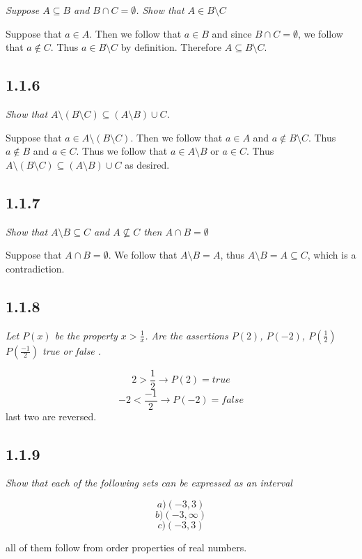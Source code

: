 \documentclass[11pt,oneside,titlepage]{book}
\begin{document}
\textit{Suppose $A \subseteq B$ and $B \cap C = \emptyset$. Show that $A \in B \setminus C$}

Suppose that $a \in A$. Then we follow that $a \in B$ and since $B \cap C = \emptyset$, we
follow that $a \notin C$. Thus $a \in B \setminus C$ by definition. Therefore
$A \subseteq B \setminus C$.

\subsection*{1.1.6}

\textit{Show that $A \setminus (B \setminus C) \subseteq (A \setminus B) \cup C$.}

Suppose that $a \in A \setminus (B \setminus C)$. Then we follow that
$a \in A$ and $a \notin B \setminus C$. Thus $a \notin B$ and $a \in C$. Thus we
follow that $a \in A \setminus B$ or $a \in C$. Thus
$A \setminus (B \setminus C) \subseteq (A \setminus B) \cup C$
as desired.

\subsection*{1.1.7}

\textit{Show that $A \setminus B \subseteq C$ and $A \not \subseteq C$ then
  $A \cap B = \emptyset$}

Suppose that $A \cap B = \emptyset$. We follow that $A \setminus B = A$, thus
$A \setminus B = A \subseteq C$, which is a contradiction.

\subsection*{1.1.8}

\textit{Let $P(x)$ be the property $x > \frac 1 x$. Are the assertions $P(2)$, $P(-2)$,
  $P(\frac 1 2)$ $P( \frac{-1}{2})$ true or false .}

$$2 > \frac 1 2 \to P(2) = true$$
$$-2 < \frac{-1}{2} \to P(-2) = false$$
last two are reversed.

\subsection*{1.1.9}

\textit{Show that each of the following sets can be expressed as an interval}

$$a) (-3, 3)$$
$$b) (-3, \infty)$$
$$c) (-3, 3)$$

all of them follow from order properties of real numbers.
\end{document}
